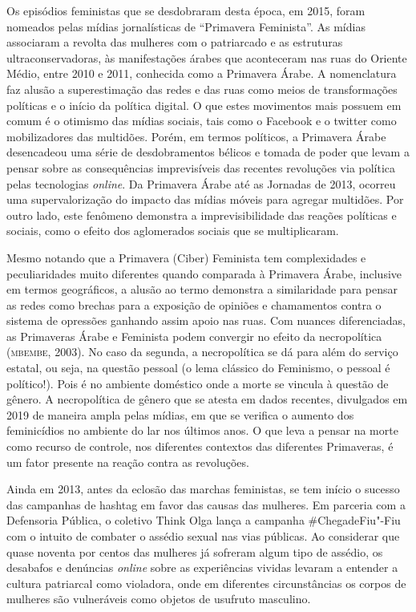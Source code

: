 Os episódios feministas que se desdobraram desta época, em 2015, foram
nomeados pelas mídias jornalísticas de ``Primavera Feminista''. As
mídias associaram a revolta das mulheres com o patriarcado e as
estruturas ultraconservadoras, às manifestações árabes que aconteceram
nas ruas do Oriente Médio, entre 2010 e 2011, conhecida como a Primavera
Árabe. A nomenclatura faz alusão a superestimação das redes e das ruas
como meios de transformações políticas e o início da política digital. O
que estes movimentos mais possuem em comum é o otimismo das mídias
sociais, tais como o Facebook e o twitter como mobilizadores das
multidões. Porém, em termos políticos, a Primavera Árabe desencadeou uma
série de desdobramentos bélicos e tomada de poder que levam a pensar
sobre as consequências imprevisíveis das recentes revoluções via
política pelas tecnologias \emph{online}. Da Primavera Árabe até as Jornadas
de 2013, ocorreu uma supervalorização do impacto das mídias móveis para
agregar multidões. Por outro lado, este fenômeno demonstra a
imprevisibilidade das reações políticas e sociais, como o efeito dos
aglomerados sociais que se multiplicaram.

Mesmo notando que a Primavera (Ciber) Feminista tem complexidades e
peculiaridades muito diferentes quando comparada à Primavera Árabe,
inclusive em termos geográficos, a alusão ao termo demonstra a
similaridade para pensar as redes como brechas para a exposição de
opiniões e chamamentos contra o sistema de opressões ganhando assim
apoio nas ruas. Com nuances diferenciadas, as Primaveras Árabe e
Feminista podem convergir no efeito da necropolítica (\textsc{mbembe}, 2003). No
caso da segunda, a necropolítica se dá para além do serviço estatal, ou
seja, na questão pessoal (o lema clássico do Feminismo, o pessoal é
político!). Pois é no ambiente doméstico onde a morte se vincula à
questão de gênero. A necropolítica de gênero que se atesta em dados
recentes, divulgados em 2019 de maneira ampla pelas mídias, em que se
verifica o aumento dos feminicídios no ambiente do lar nos últimos anos.
O que leva a pensar na morte como recurso de controle, nos diferentes
contextos das diferentes Primaveras, é um fator presente na reação
contra as revoluções.

Ainda em 2013, antes da eclosão das marchas feministas, se tem início o
sucesso das campanhas de hashtag em favor das causas das mulheres. Em
parceria com a Defensoria Pública, o coletivo Think Olga lança a
campanha \#ChegadeFiu"-Fiu com o intuito de combater o assédio sexual nas
vias públicas. Ao considerar que quase noventa por centos das mulheres
já sofreram algum tipo de assédio, os desabafos e denúncias \emph{online}
sobre as experiências vividas levaram a entender a cultura patriarcal
como violadora, onde em diferentes circunstâncias os corpos de mulheres
são vulneráveis como objetos de usufruto masculino.

